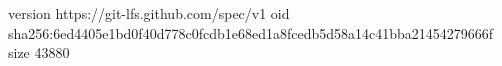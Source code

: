 version https://git-lfs.github.com/spec/v1
oid sha256:6ed4405e1bd0f40d778c0fcdb1e68ed1a8fcedb5d58a14c41bba21454279666f
size 43880
